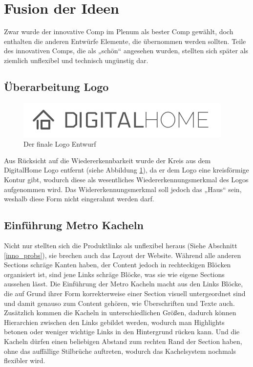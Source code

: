 \section{Fusion der Ideen}
Zwar wurde der innovative Comp im Plenum als bester Comp gewählt, doch enthalten die anderen Entwürfe Elemente, die übernommen werden sollten. Teile des innovativen Comps, die als „schön“ angesehen wurden, stellten sich später als ziemlich unflexibel und technisch ungünstig dar.
\subsection{Überarbeitung Logo}
\begin{figure} [tp]
\includegraphics[width=\textwidth]{./img/logo3.png}
\caption{Der finale Logo Entwurf}
\label{logo3}
\end{figure}
Aus Rücksicht auf die Wiedererkennbarkeit wurde der Kreis aus dem DigitalHome Logo entfernt (siehe Abbildung \ref{logo3}), da er dem Logo eine kreisförmige Kontur gibt, wodurch diese als wesentliches Wiedererkennungsmerkmal des Logos aufgenommen wird. Das Widererkennungsmerkmal soll jedoch das „Haus“ sein, weshalb diese Form nicht eingerahmt werden darf.

\subsection{Einführung Metro Kacheln}
Nicht nur stellten sich die Produktlinks als unflexibel heraus (Siehe Abschnitt \ref{inno_probs}), sie brechen auch das Layout der Website. Während alle anderen Sections schräge Kanten haben, der Content jedoch in rechteckigen Blöcken organisiert ist, sind jene Links schräge Blöcke, was sie wie eigene Sections aussehen lässt. Die Einführung der Metro Kacheln macht aus den Links Blöcke, die auf Grund ihrer Form korrekterweise einer Section visuell untergeordnet sind und damit genauso zum Content gehören, wie Überschriften und Texte auch. Zusätzlich kommen die Kacheln in unterschiedlichen Größen, dadurch können Hierarchien zwischen den Links gebildet werden, wodurch man Highlights betonen oder weniger wichtige Links in den Hintergrund rücken kann. Und die Kacheln dürfen einen beliebigen Abstand zum rechten Rand der Section haben, ohne das auffällige Stilbrüche auftreten, wodurch das Kachelsystem nochmals flexibler wird.
